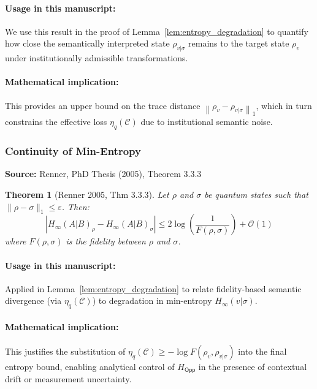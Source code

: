 \documentclass[preprint,12pt]{elsarticle}
\newtheorem{theorem}{Theorem}[section]
\begin{document}
                    \paragraph{Usage in this manuscript:}
                    We use this result in the proof of Lemma~\ref{lem:entropy_degradation} to quantify how close the semantically interpreted state $\rho_{v|\sigma}$ remains to the target state $\rho_v$ under institutionally admissible transformations.

                    \paragraph{Mathematical implication:}
                    This provides an upper bound on the trace distance $\left\| \rho_v - \rho_{v|\sigma} \right\|_1$, which in turn constrains the effective loss $\eta_q(\mathcal{C})$ due to institutional semantic noise.

                \subsubsection{Continuity of Min-Entropy}
                    \textbf{Source:} Renner, PhD Thesis (2005), Theorem 3.3.3

                    \begin{theorem}[Renner 2005, Thm 3.3.3]
                    Let $\rho$ and $\sigma$ be quantum states such that $\| \rho - \sigma \|_1 \leq \varepsilon$. Then:
                    \[
                    \left| H_\infty(A|B)_\rho - H_\infty(A|B)_\sigma \right| \leq 2 \log \left( \frac{1}{F(\rho, \sigma)} \right) + \mathcal{O}(1)
                    \]
                    where $F(\rho, \sigma)$ is the fidelity between $\rho$ and $\sigma$.
                    \end{theorem}

                    \paragraph{Usage in this manuscript:}
                    Applied in Lemma~\ref{lem:entropy_degradation} to relate fidelity-based semantic divergence (via $\eta_q(\mathcal{C})$) to degradation in min-entropy $H_\infty(v|\sigma)$.

                    \paragraph{Mathematical implication:}
                    This justifies the substitution of $\eta_q(\mathcal{C}) \geq -\log F(\rho_v, \rho_{v|\sigma})$ into the final entropy bound, enabling analytical control of $H_{\mathsf{Opp}}$ in the presence of contextual drift or measurement uncertainty.
\end{document}
